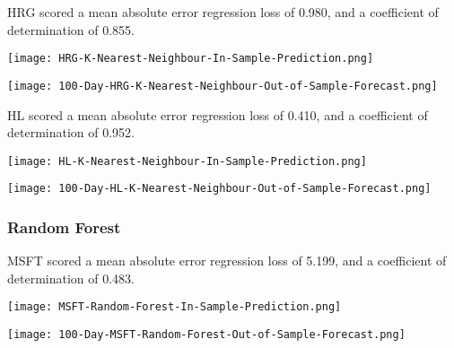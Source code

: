 HRG scored a mean absolute error regression loss of 0.980, and a coefficient of determination of 0.855.

\begin{center}
    \texttt{[image: HRG-K-Nearest-Neighbour-In-Sample-Prediction.png]}
    \label{fig:nonfloat}
\end{center}

\begin{center}  
    \texttt{[image: 100-Day-HRG-K-Nearest-Neighbour-Out-of-Sample-Forecast.png]}
    \label{fig:nonfloat}
\end{center}

HL scored a mean absolute error regression loss of 0.410, and a coefficient of determination of 0.952.

\begin{center}
    \texttt{[image: HL-K-Nearest-Neighbour-In-Sample-Prediction.png]}
    \label{fig:nonfloat}
\end{center}

\begin{center}  
    \texttt{[image: 100-Day-HL-K-Nearest-Neighbour-Out-of-Sample-Forecast.png]}
    \label{fig:nonfloat}
\end{center}

\subsubsection{Random Forest}
MSFT scored a mean absolute error regression loss of 5.199, and a coefficient of determination of 0.483.

\begin{center}
    \texttt{[image: MSFT-Random-Forest-In-Sample-Prediction.png]}
    \label{fig:nonfloat}
\end{center}

\begin{center}  
    \texttt{[image: 100-Day-MSFT-Random-Forest-Out-of-Sample-Forecast.png]}
    \label{fig:nonfloat}
\end{center}

